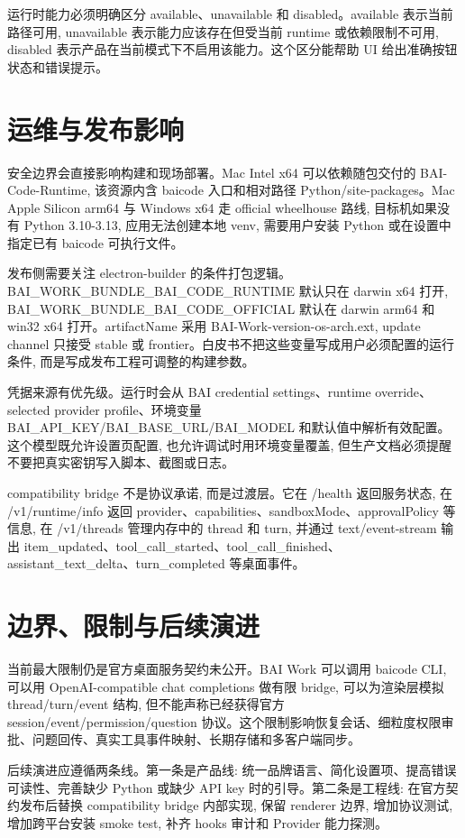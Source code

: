 运行时能力必须明确区分 available、unavailable 和 disabled。available 表示当前路径可用, unavailable 表示能力应该存在但受当前 runtime 或依赖限制不可用, disabled 表示产品在当前模式下不启用该能力。这个区分能帮助 UI 给出准确按钮状态和错误提示。

\section{运维与发布影响}
安全边界会直接影响构建和现场部署。Mac Intel x64 可以依赖随包交付的 BAI-Code-Runtime, 该资源内含 baicode 入口和相对路径 Python/site-packages。Mac Apple Silicon arm64 与 Windows x64 走 official wheelhouse 路线, 目标机如果没有 Python 3.10-3.13, 应用无法创建本地 venv, 需要用户安装 Python 或在设置中指定已有 baicode 可执行文件。

发布侧需要关注 electron-builder 的条件打包逻辑。BAI\_WORK\_BUNDLE\_BAI\_CODE\_RUNTIME 默认只在 darwin x64 打开, BAI\_WORK\_BUNDLE\_BAI\_CODE\_OFFICIAL 默认在 darwin arm64 和 win32 x64 打开。artifactName 采用 BAI-Work-{version}-{os}-{arch}.{ext}, update channel 只接受 stable 或 frontier。白皮书不把这些变量写成用户必须配置的运行条件, 而是写成发布工程可调整的构建参数。

凭据来源有优先级。运行时会从 BAI credential settings、runtime override、selected provider profile、环境变量 BAI\_API\_KEY/BAI\_BASE\_URL/BAI\_MODEL 和默认值中解析有效配置。这个模型既允许设置页配置, 也允许调试时用环境变量覆盖, 但生产文档必须提醒不要把真实密钥写入脚本、截图或日志。

compatibility bridge 不是协议承诺, 而是过渡层。它在 /health 返回服务状态, 在 /v1/runtime/info 返回 provider、capabilities、sandboxMode、approvalPolicy 等信息, 在 /v1/threads 管理内存中的 thread 和 turn, 并通过 text/event-stream 输出 item\_updated、tool\_call\_started、tool\_call\_finished、assistant\_text\_delta、turn\_completed 等桌面事件。

\section{边界、限制与后续演进}
当前最大限制仍是官方桌面服务契约未公开。BAI Work 可以调用 baicode CLI, 可以用 OpenAI-compatible chat completions 做有限 bridge, 可以为渲染层模拟 thread/turn/event 结构, 但不能声称已经获得官方 session/event/permission/question 协议。这个限制影响恢复会话、细粒度权限审批、问题回传、真实工具事件映射、长期存储和多客户端同步。

后续演进应遵循两条线。第一条是产品线: 统一品牌语言、简化设置项、提高错误可读性、完善缺少 Python 或缺少 API key 时的引导。第二条是工程线: 在官方契约发布后替换 compatibility bridge 内部实现, 保留 renderer 边界, 增加协议测试, 增加跨平台安装 smoke test, 补齐 hooks 审计和 Provider 能力探测。

